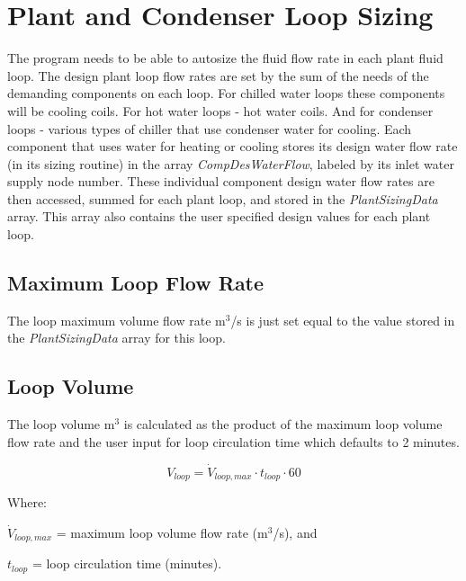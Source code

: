 \section{Plant and Condenser Loop Sizing}\label{plant-condenser-loop-sizing}

The program needs to be able to autosize the fluid flow rate in each plant fluid loop. The design plant loop flow rates are set by the sum of the needs of the demanding components on each loop. For chilled water loops these components will be cooling coils. For hot water loops - hot water coils. And for condenser loops - various types of chiller that use condenser water for cooling. Each component that uses water for heating or cooling stores its design water flow rate (in its sizing routine) in the array \emph{CompDesWaterFlow}, labeled by its inlet water supply node number. These individual component design water flow rates are then accessed, summed for each plant loop, and stored in the \emph{PlantSizingData} array. This array also contains the user specified design values for each plant loop.

\subsection{Maximum Loop Flow Rate}\label{maximum-loop-flow-rate}

The loop maximum volume flow rate m\(^{3}\)/s is just set equal to the value stored in the \emph{PlantSizingData} array for this loop.

\subsection{Loop Volume}\label{volume-of-the-plant-loop}

The loop volume m\(^{3}\) is calculated as the product of the maximum loop volume flow rate and the user input for loop circulation time which defaults to 2 minutes.

\begin{equation}
V_{loop} = \dot{V}_{loop,max} \cdot t_{loop} \cdot 60
\end{equation}

Where:

\(\dot{V}_{loop,max}\) = maximum loop volume flow rate  (m\(^{3}\)/s), and

\(t_{loop}\) = loop circulation time (minutes).
